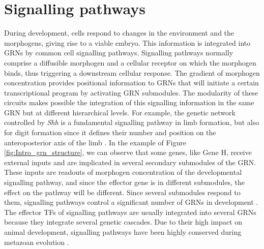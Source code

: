 \section{Signalling pathways}

During development, cells respond to changes in the environment and the morphogens, giving rise to a viable embryo. This information is integrated into GRNs by common cell signalling pathways. Signalling pathways normally comprise a diffusible morphogen and a cellular receptor on which the morphogen binds, thus triggering a downstream cellular response. The gradient of morphogen concentration provides positional information to GRNs that will initiate a certain transcriptional program by activating GRN submodules. The modularity of these circuits makes possible the integration of this signalling information in the same GRN but at different hierarchical levels. For example, the genetic network controlled by \textit{Shh} is a fundamental signalling pathway in limb formation, but also for digit formation since it defines their number and position on the anteroposterior axis of the limb \parencite{lopez-rios_many_2016}. In the example of Figure \ref{fig:Intro_grn_structure}, we can observe that some genes, like Gene H, receive external inputs and are implicated in several secondary submodules of the GRN. These inputs are readouts of morphogen concentration of the developmental signalling pathway, and since the effector gene is in different submodules, the effect on the pathway will be different. Since several submodules respond to them, signalling pathways control a significant number of GRNs in development \parencite{pires-dasilva_evolution_2003}. The effector TFs of signalling pathways are usually integrated into several GRNs because they integrate several genetic cascades. Due to their high impact on animal development, signalling pathways have been highly conserved during metazoan evolution \parencite{babonis_phylogenetic_2017}.

